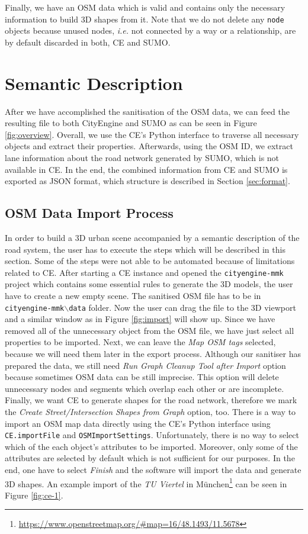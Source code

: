 Finally, we have an OSM data which is valid and contains only the necessary information to build 3D shapes from it. Note that we do not delete any \texttt{node} objects because unused nodes, \emph{i.e.} not connected by a way or a relationship, are by default discarded in both, CE and SUMO.

\section{Semantic Description}
After we have accomplished the sanitisation of the OSM data, we can feed the resulting file to both CityEngine and SUMO as can be seen in Figure \ref{fig:overview}. Overall, we use the CE's Python interface to traverse all necessary objects and extract their properties. Afterwards, using the OSM ID, we extract lane information about the road network generated by SUMO, which is not available in CE. In the end, the combined information from CE and SUMO is exported as JSON format, which structure is described in Section \ref{sec:format}. 

\subsection{OSM Data Import Process}
In order to build a 3D urban scene accompanied by a semantic description of the road system, the user has to execute the steps which will be described in this section. Some of the steps were not able to be automated because of limitations related to CE. After starting a CE instance and opened the \texttt{cityengine-mmk} project which contains some essential rules to generate the 3D models, the user have to create a new empty scene. The sanitised OSM file has to be in \texttt{cityengine-mmk$\backslash$data} folder. Now the user can drag the file to the 3D viewport and a similar window as in Figure \ref{fig:import} will show up. Since we have removed all of the unnecessary object from the OSM file, we have just select all properties to be imported. Next, we can leave the \emph{Map OSM tags} selected, because we will need them later in the export process. Although our sanitiser has prepared the data, we still need \emph{Run Graph Cleanup Tool after Import} option because sometimes OSM data can be still imprecise. This option will delete unnecessary nodes and segments which overlap each other or are incomplete. Finally, we want CE to generate shapes for the road network, therefore we mark the \emph{Create Street/Intersection Shapes from Graph} option, too. There is a way to import an OSM map data directly using the CE's Python interface using \texttt{CE.importFile} and \texttt{OSMImportSettings}. Unfortunately, there is no way to select which of the each object's attributes to be imported. Moreover, only some of the attributes are selected by default which is not sufficient for our purposes. In the end, one have to select \emph{Finish} and the software will import the data and generate 3D shapes. An example import of the \emph{TU Viertel} in M\"unchen\footnote{\url{https://www.openstreetmap.org/#map=16/48.1493/11.5678}} can be seen in Figure \ref{fig:ce-1}.


